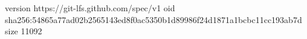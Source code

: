 version https://git-lfs.github.com/spec/v1
oid sha256:54865a77ad02b2565143ed8f0ac5350b1d89986f24d1871a1bcbc11cc193ab7d
size 11092
